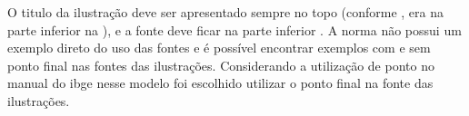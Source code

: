 O titulo da ilustração deve ser apresentado sempre no topo (conforme , era na parte inferior na  ), e a fonte deve ficar na parte inferior \cite{NBR14724:2011}. A norma não possui um exemplo direto do uso das fontes e é possível encontrar exemplos com e sem ponto final nas fontes das ilustrações. Considerando a utilização de ponto no manual do \ac{ibge} nesse modelo foi escolhido utilizar o ponto final na fonte das ilustrações.











